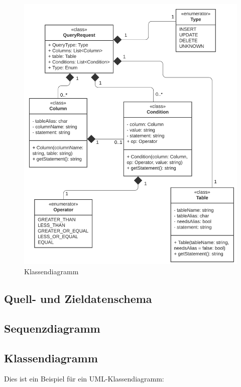 \documentclass[11pt,toc=sectionentrywithoutdots, 
headheight=44pt, headings=optiontoheadandtoc, hyperfootnotes=false, hypertexnames=false]{scrartcl}
\begin{document}
 \begin{figure}[htp]
 \centering

	\includegraphics{UML-Klasse.png}
	 \caption{Klassendiagramm}
 \end{figure}
 \clearpage
 
 
  
 

\subsection{Quell- und Zieldatenschema}
\blindtext\blindtext

\subsection{Sequenzdiagramm}
\blindtext


\subsection{Klassendiagramm}

Dies ist ein Beispiel für ein UML-Klassendiagramm:\\
\end{document}
